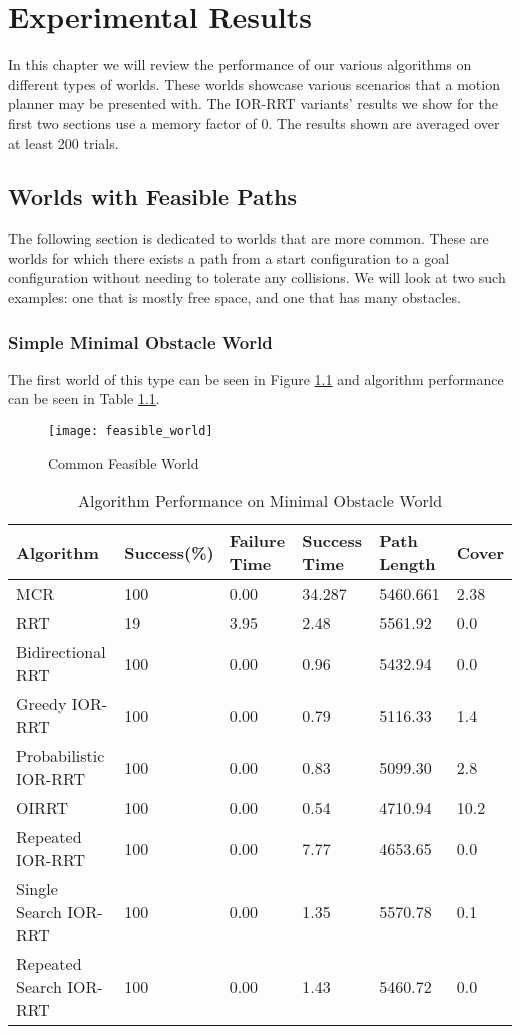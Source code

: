 \chapter{Experimental Results}
In this chapter we will review the performance of our various algorithms on different types of worlds. These worlds showcase various scenarios that a motion planner may be presented with. The IOR-RRT variants' results we show for the first two sections use a memory factor of 0. The results shown are averaged over at least 200 trials.
\section{Worlds with Feasible Paths}
The following section is dedicated to worlds that are more common. These are worlds for which there exists a path from a start configuration to a goal configuration without needing to tolerate any collisions. We will look at two such examples: one that is mostly free space, and one that has many obstacles.

\subsection{Simple Minimal Obstacle World}
The first world of this type can be seen in Figure \ref{fig:feasible_world} and algorithm performance can be seen in Table \ref{tab:feasible_world}. 

\begin{figure}[h!]
    \centering
    \texttt{[image: feasible\_world]}
    \caption{Common Feasible World}
    \label{fig:feasible_world}
\end{figure}

\begin{table}[h!]
\begin{tabular}{@{}llllll@{}}
\toprule
Algorithm & Success(\%)  & Failure Time  & Success Time  & Path Length & Cover\\ 
\midrule
MCR & 100 & 0.00 & 34.287 & 5460.661 & 2.38 \\
RRT & 19 & 3.95 & 2.48 & 5561.92 & 0.0 \\ 
Bidirectional RRT & 100 & 0.00 & 0.96 & 5432.94 & 0.0 \\
Greedy IOR-RRT & 100 & 0.00 & 0.79 & 5116.33 & 1.4 \\
Probabilistic IOR-RRT & 100 & 0.00 & 0.83 & 5099.30 & 2.8 \\
OIRRT & 100 & 0.00 & 0.54 & 4710.94 & 10.2 \\
Repeated IOR-RRT & 100 & 0.00 & 7.77 & 4653.65 & 0.0 \\
Single Search IOR-RRT & 100 & 0.00 & 1.35 & 5570.78 & 0.1 \\
Repeated Search IOR-RRT & 100 & 0.00 & 1.43 & 5460.72 & 0.0 \\
\bottomrule
\end{tabular}
\caption{Algorithm Performance on Minimal Obstacle World}
\label{tab:feasible_world}
\end{table}

